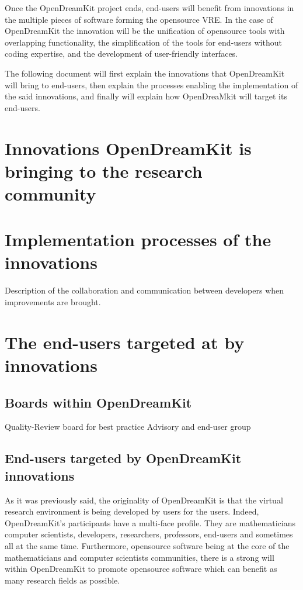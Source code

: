 \documentclass{deliverablereport}
\begin{document}
Once the OpenDreamKit project ends, end-users will benefit from innovations in the multiple pieces of software forming the opensource VRE. In the case of OpenDreamKit the innovation will be the unification of opensource tools with overlapping functionality, the simplification of the tools for end-users without coding expertise, and the development of user-friendly interfaces.

The following document will first explain the innovations that OpenDreamKit will bring to end-users, then explain the processes enabling the implementation of the said innovations, and finally will explain how OpenDreaMkit will target its end-users.


\section{Innovations OpenDreamKit is bringing to the research community}

\section{Implementation processes of the innovations}
Description of the collaboration and communication between developers when improvements are brought.

\section{The end-users targeted at by innovations}
\subsection{Boards within OpenDreamKit}
Quality-Review board for best practice
Advisory and end-user group

\subsection{End-users targeted by OpenDreamKit innovations}

As it was previously said, the originality of OpenDreamKit is that the virtual research environment is being developed by users for the users. Indeed, OpenDreamKit's participants have a multi-face profile. They are mathematicians computer scientists, developers, researchers, professors, end-users and sometimes all at the same time. Furthermore, opensource software being at the core of the mathematicians and computer scientists communities, there is a strong will within OpenDreamKit to promote opensource software which can benefit as many research fields as possible.
\end{document}
